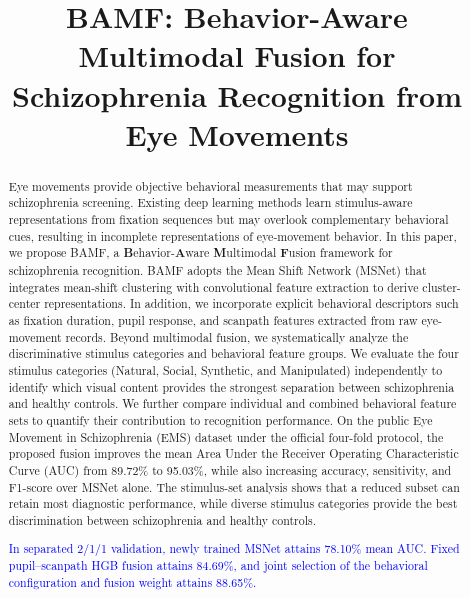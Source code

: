 \documentclass[conference,a4paper]{IEEEtran}
\begin{document}
\title{BAMF: Behavior-Aware Multimodal Fusion for Schizophrenia Recognition from Eye Movements}

\author{
}

\maketitle

\begin{abstract}
Eye movements provide objective behavioral measurements that may support schizophrenia screening. Existing deep learning methods learn stimulus-aware representations from fixation sequences but may overlook complementary behavioral cues, resulting in incomplete representations of eye-movement behavior. In this paper, we propose BAMF, a \textbf{B}ehavior-\textbf{A}ware \textbf{M}ultimodal \textbf{F}usion framework for schizophrenia recognition. BAMF adopts the Mean Shift Network (MSNet) that integrates mean-shift clustering with convolutional feature extraction to derive cluster-center representations. In addition, we incorporate explicit behavioral descriptors such as fixation duration, pupil response, and scanpath features extracted from raw eye-movement records. Beyond multimodal fusion, we systematically analyze the discriminative stimulus categories and behavioral feature groups. We evaluate the four stimulus categories (Natural, Social, Synthetic, and Manipulated) independently to identify which visual content provides the strongest separation between schizophrenia and healthy controls. We further compare individual and combined behavioral feature sets to quantify their contribution to recognition performance. On the public Eye Movement in Schizophrenia (EMS) dataset under the official four-fold protocol, the proposed fusion improves the mean Area Under the Receiver Operating Characteristic Curve (AUC) from 89.72\% to 95.03\%, while also increasing accuracy, sensitivity, and F1-score over MSNet alone. The stimulus-set analysis shows that a reduced subset can retain most diagnostic performance, while diverse stimulus categories provide the best discrimination between schizophrenia and healthy controls.

\textcolor{blue}{In separated 2/1/1 validation, newly trained MSNet attains 78.10\% mean AUC. Fixed pupil--scanpath HGB fusion attains 84.69\%, and joint selection of the behavioral configuration and fusion weight attains 88.65\%.}
\end{abstract}
\end{document}

